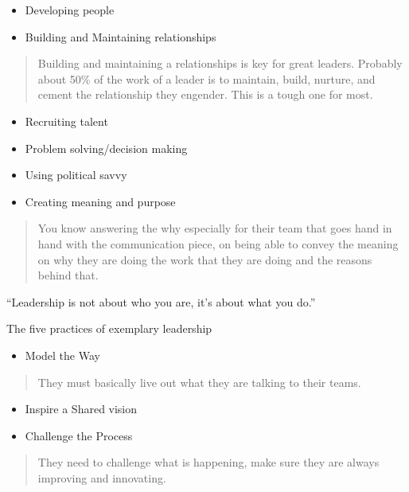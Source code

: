 \documentclass[]{book}
\begin{document}
\begin{itemize}
\item
  Developing people
\item
  Building and Maintaining relationships
\end{itemize}

\begin{quote}
Building and maintaining a relationships is key for great leaders. Probably about 50\% of the work of a leader is to maintain, build, nurture, and cement the relationship they engender. This is a tough one for most.
\end{quote}

\begin{itemize}
\item
  Recruiting talent
\item
  Problem solving/decision making
\item
  Using political savvy
\item
  Creating meaning and purpose
\end{itemize}

\begin{quote}
You know answering the why especially for their team that goes hand in hand with the communication piece, on being able to convey the meaning on why they are doing the work that they are doing and the reasons behind that.
\end{quote}

``Leadership is not about who you are, it's about what you do.''

The five practices of exemplary leadership

\begin{itemize}
\item
  Model the Way
\end{itemize}

\begin{quote}
They must basically live out what they are talking to their teams.
\end{quote}

\begin{itemize}
\item
  Inspire a Shared vision
\item
  Challenge the Process
\end{itemize}

\begin{quote}
They need to challenge what is happening, make sure they are always improving and innovating.
\end{quote}
\end{document}
